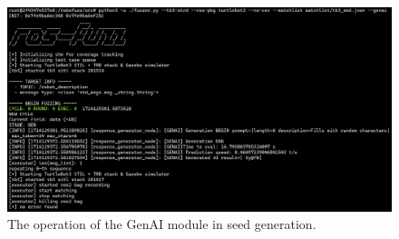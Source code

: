 

\begin{figure}[ht!]
    \centering
    \includegraphics[width=1\textwidth]{./figures/data/robofuzz_genai_01_fase1_arranque+semilla_random.png}
    \caption{The operation of the GenAI module in seed generation.}    \label{fig:robofuzz_genai_01_fase1_arranque+semilla_random}
\end{figure}